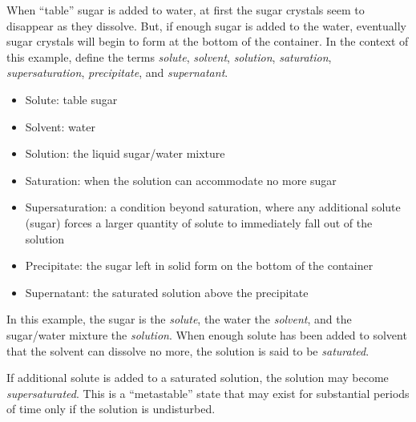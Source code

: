 

When ``table'' sugar is added to water, at first the sugar crystals seem to disappear as they dissolve.  But, if enough sugar is added to the water, eventually sugar crystals will begin to form at the bottom of the container.  In the context of this example, define the terms {\it solute}, {\it solvent}, {\it solution}, {\it saturation}, {\it supersaturation}, {\it precipitate}, and {\it supernatant}.







\begin{itemize}
\item{} Solute: table sugar
\item{} Solvent: water
\item{} Solution: the liquid sugar/water mixture
\item{} Saturation: when the solution can accommodate no more sugar
\item{} Supersaturation: a condition beyond saturation, where any additional solute (sugar) forces a larger quantity of solute to immediately fall out of the solution
\item{} Precipitate: the sugar left in solid form on the bottom of the container
\item{} Supernatant: the saturated solution above the precipitate
\end{itemize} 

In this example, the sugar is the {\it solute}, the water the {\it solvent}, and the sugar/water mixture the {\it solution}.  When enough solute has been added to solvent that the solvent can dissolve no more, the solution is said to be {\it saturated}.

If additional solute is added to a saturated solution, the solution may become {\it supersaturated}.  This is a ``metastable'' state that may exist for substantial periods of time only if the solution is undisturbed.  











